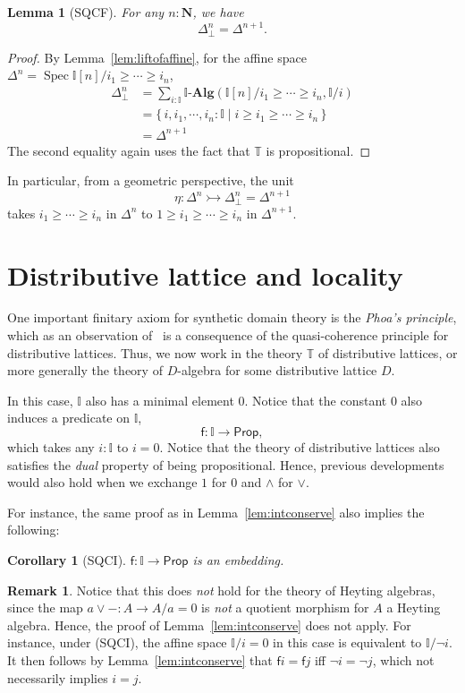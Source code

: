 \documentclass[12pt]{amsart}
\newtheorem{lemma}[theorem]{Lemma}
\newtheorem{corollary}[theorem]{Corollary}
\theoremstyle{definition}
\newtheorem{remark}[theorem]{Remark}
\newcommand{\mb}[1]{\mathbf{#1}}
\newcommand{\mbb}[1]{\mathbb{#1}}
\newcommand{\T}{\mbb T}
\newcommand{\I}{\mbb I}
\newcommand{\ms}[1]{\mathsf{#1}}
\newcommand{\alg}{\text{-}\mb{Alg}}
\newcommand{\scomp}[2]{\{\,#1\mid#2\,\}}
\newcommand{\inj}{\rightarrowtail}
\newcommand{\N}{\mb N}
\newcommand{\prt}{_{\bot}}
\newcommand{\pp}{\ms{Prop}}
\newcommand{\spec}{\operatorname{Spec}}
\begin{document}
\begin{lemma}[SQCF]
  For any $n : \N$, we have
  \[ \Delta^n\prt = \Delta^{n+1}. \]
\end{lemma}
\begin{proof}
  By Lemma~\ref{lem:liftofaffine}, for the affine space $\Delta^n = \spec\I[n]/i_1 \ge \cdots \ge i_n$,
  \begin{align*}
    \Delta^n\prt 
    &= \sum_{i:\I}\I\alg(\I[n]/i_1\ge\cdots\ge i_n,\I/i) \\
    &= \scomp{i,i_1,\cdots,i_n:\I}{i \ge i_1 \ge \cdots \ge i_n} \\
    &= \Delta^{n+1}
  \end{align*}
  The second equality again uses the fact that $\T$ is propositional.
\end{proof}

In particular, from a geometric perspective, the unit
\[ \eta : \Delta^n \inj \Delta^n\prt = \Delta^{n+1} \]
takes $i_1 \ge \cdots \ge i_n$ in $\Delta^n$ to $1 \ge i_1 \ge \cdots \ge i_n$ in $\Delta^{n+1}$. 

\section{Distributive lattice and locality}\label{sec:locality}

One important finitary axiom for synthetic domain theory is the \emph{Phoa's principle}, which as an observation of~\cite{gratzer2024directed} is a consequence of the quasi-coherence principle for distributive lattices. Thus, we now work in the theory $\T$ of distributive lattices, or more generally the theory of $D$-algebra for some distributive lattice $D$.

In this case, $\I$ also has a minimal element $0$. Notice that the constant $0$ also induces a predicate on $\I$,
\[ \ms f : \I \to \pp, \]
which takes any $i : \I$ to $i = 0$. Notice that the theory of distributive lattices also satisfies the \emph{dual} property of being propositional. Hence, previous developments would also hold when we exchange $1$ for $0$ and $\wedge$ for $\vee$. 

For instance, the same proof as in Lemma~\ref{lem:intconserve} also implies the following:

\begin{corollary}[SQCI]
  $\ms f : \I \to \pp$ is an embedding.
\end{corollary}

\begin{remark}\label{rem:prefield}
  Notice that this does \emph{not} hold for the theory of Heyting algebras, since the map $a \vee - : A \to A/a = 0$ is \emph{not} a quotient morphism for $A$ a Heyting algebra. Hence, the proof of Lemma~\ref{lem:intconserve} does not apply. For instance, under (SQCI), the affine space $\I/i=0$ in this case is equivalent to $\I/\neg i$. It then follows by Lemma~\ref{lem:intconserve} that $\ms fi = \ms fj$ iff $\neg i = \neg j$, which not necessarily implies $i = j$.
\end{remark}
\end{document}
